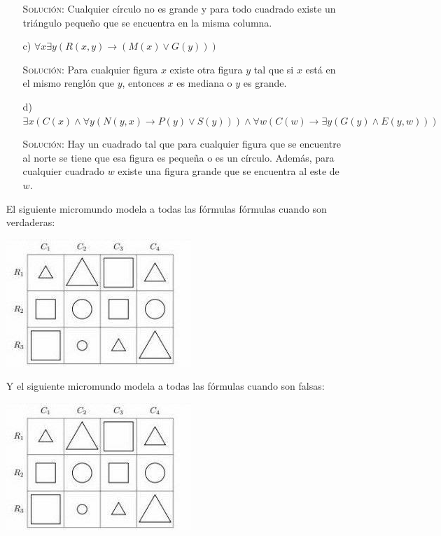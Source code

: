 \documentclass[letterpaper,11pt]{article}
\begin{document}
\begin{enumerate}
\begin{itemize}
        \textsc{Solución:} Cualquier círculo no es grande y para todo cuadrado  
        existe un triángulo pequeño que se encuentra en la misma columna.

        \item[c)] $∀x ∃y (R(x, y) → (M(x) \lor G(y)))$ 

        \textsc{Solución:} Para cualquier figura $x$ existe otra figura $y$ tal 
        que si $x$ está en el mismo renglón que $y$, entonces $x$ es mediana 
        o $y$ es grande. 

        \item[d)] $∃x (C(x) \land ∀y (N(y, x) → P(y) \lor S(y))) \land 
                  ∀w (C(w) → ∃y (G(y) \land E(y, w)))$

        \textsc{Solución:} Hay un cuadrado tal que para cualquier figura que se 
        encuentre al norte se tiene que esa figura es pequeña o es un círculo.
        Además, para cualquier cuadrado $w$ existe una figura grande que se 
        encuentra al este de $w$.
    \end{itemize}

    El siguiente micromundo modela a todas las fórmulas fórmulas cuando son 
    verdaderas:

    \begin{center}
        \centerline{\includegraphics[scale=0.7]{modelo1.jpg}}
    \end{center}

    Y el siguiente micromundo modela a todas las fórmulas cuando son falsas:

    \begin{center}
        \centerline{\includegraphics[scale=0.7]{modelo2.jpg}}
    \end{center}
\end{enumerate}
\end{document}
